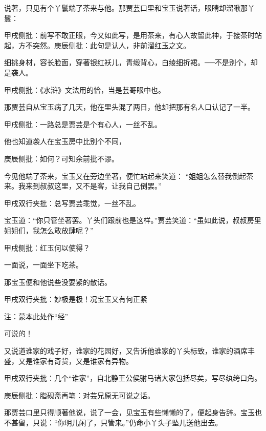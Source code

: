 \begin{parag}
    说著，只见有个丫鬟端了茶来与他。那贾芸口里和宝玉说著话，眼睛却溜瞅那丫鬟：\begin{note}甲戌侧批：前写不敢正眼，今又如此写，是用茶来，有心人故留此神，于接茶时站起，方不突然。庚辰侧批：此句是认人，非前溜红玉之文。\end{note}细挑身材，容长脸面，穿著银红袄儿，青缎背心，白绫细折裙。──不是别个，却是袭人。\begin{note}甲戌侧批：《水浒》文法用的恰，当是芸哥眼中也。\end{note}那贾芸自从宝玉病了几天，他在里头混了两日，他却把那有名人口认记了一半。\begin{note}甲戌侧批：一路总是贾芸是个有心人，一丝不乱。\end{note}他也知道袭人在宝玉房中比别个不同，\begin{note}庚辰侧批：如何？可知余前批不谬。\end{note}今见他端了茶来，宝玉又在旁边坐著，便忙站起来笑道： “姐姐怎么替我倒起茶来。我来到叔叔这里，又不是客，让我自己倒罢。”\begin{note}甲戌双行夹批：总写贾芸乖觉，一丝不乱。\end{note}宝玉道：“你只管坐著罢。丫头们跟前也是这样。”贾芸笑道：“虽如此说，叔叔房里姐姐们，我怎么敢放肆呢？”\begin{note}甲戌侧批：红玉何以使得？\end{note}一面说，一面坐下吃茶。
\end{parag}


\begin{parag}
    那宝玉便和他说些没要紧的散话。\begin{note}甲戌双行夹批：妙极是极！况宝玉又有何正紧\begin{subnote}注：蒙本此处作“经”\end{subnote}可说的！\end{note}又说道谁家的戏子好，谁家的花园好，又告诉他谁家的丫头标致，谁家的酒席丰盛，又是谁家有奇货，又是谁家有异物。\begin{note}甲戌双行夹批：几个“谁家”，自北静王公侯驸马诸大家包括尽矣，写尽纨绔口角。\end{note}\begin{note}庚辰侧批：脂砚斋再笔：对芸兄原无可说之话。\end{note}那贾芸口里只得顺著他说，说了一会，见宝玉有些懒懒的了，便起身告辞。宝玉也不甚留，只说：“你明儿闲了，只管来。”仍命小丫头子坠儿送他出去。
\end{parag}


